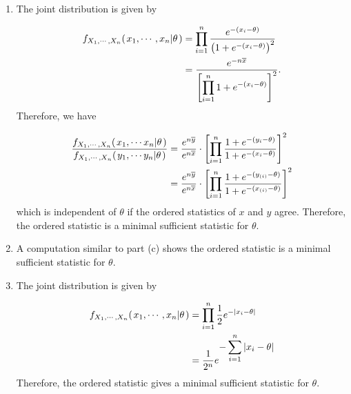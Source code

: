 \documentclass[12pt,letterpaper,reqno]{amsart}
\numberwithin{equation}{subsection}
\begin{document}
\begin{enumerate}[label=(\alph*),leftmargin=*]
    \item The joint distribution is given by
    
    \begin{align*}
        {f_{X_1, \cdots, X_n}}\! \left( {\left. {x_1, \cdots, x_n} \middle| {\theta} \right.} \right) &= \prod_{i=1}^n \frac{e^{-(x_i-\theta)}}{\left(1 + e^{-(x_i-\theta)} \right)^2} \\
        &= \frac{e^{-n \overline{{x}}}}{ \left[\displaystyle \prod_{i=1}^n 1 + e^{-(x_i - \theta)} \right]^2}.
    \end{align*}
    Therefore, we have
    
    \begin{align*}
         \frac{{f_{X_1, \cdots, X_n}}\! \left( {\left. {x_1, \cdots x_n} \middle| {\theta} \right.} \right)}{{f_{X_1, \cdots, X_n}}\! \left( {\left. {y_1, \cdots y_n} \middle| {\theta} \right.} \right)} &= \frac{e^{n \overline{{y}}}}{e^{n \overline{{x}}}} \cdot \left[ \prod_{i=1}^n \frac{1 + e^{-(y_i - \theta)}}{1 + e^{-(x_i - \theta)}} \right]^2 \\
         &= \frac{e^{n \overline{{y}}}}{e^{n \overline{{x}}}} \cdot \left[ \prod_{i=1}^n \frac{1 + e^{-(y_{(i)} - \theta)}}{1 + e^{-(x_{(i)} - \theta)}} \right]^2
    \end{align*}
    which is independent of $\theta$ if the ordered statistics of $x$ and $y$ agree. Therefore, the ordered statistic is a minimal sufficient statistic for $\theta$.
    
    \item A computation similar to part (c) shows the ordered statistic is a minimal sufficient statistic for $\theta$.
    
    \item The joint distribution is given by
    
    \begin{align*}
         {f_{X_1, \cdots, X_n}}\! \left( {\left. {x_1, \cdots, x_n} \middle| {\theta} \right.} \right) &= \prod_{i=1}^n \frac{1}{2} e^{-\left\lvert{x_i-\theta}\right\rvert} \\
         &= \frac{1}{2^n} e^{\displaystyle -\sum_{i=1}^n \left\lvert{x_i - \theta}\right\rvert}
    \end{align*}
    Therefore, the ordered statistic gives a minimal sufficient statistic for $\theta$.
    
\end{enumerate}


\newpage
\nocite{*}
\printbibliography
\end{document}
